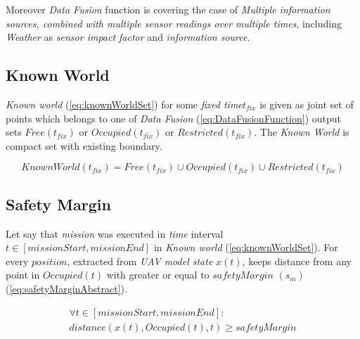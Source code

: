     
    \begin{note}
    Moreover \emph{Data Fusion} function is covering the case of \emph{Multiple information sources, combined with multiple sensor readings over multiple times}, including \emph{Weather} as \emph{sensor impact factor} and \emph{information source}. 
    \end{note}

\subsection{Known World}\label{s:KnownWorld}
    \emph{Known world} (\ref{eq:knownWorldSet}) for some \emph{fixed time}$t_{fix}$ is given as joint set of points which belongs to one of \emph{Data Fusion} (\ref{eq:DataFusionFunction}) output sets $Free(t_{fix})$ or $Occupied(t_{fix})$ or $Restricted(t_{fix})$. The \emph{Known World} is compact set with existing boundary.
    
    \begin{equation}\label{eq:knownWorldSet}
        KnownWorld(t_{fix})= Free(t_{fix}) \cup Occupied(t_{fix}) \cup Restricted(t_{fix})
    \end{equation}



\subsection{Safety Margin}\label{s:SafetyMarginDefinition}
    \noindent Let say that \emph{mission} was executed in \emph{time} interval $t\in [missionStart,missionEnd]$ in \emph{Known world} (\ref{eq:knownWorldSet}). For every $position$, extracted from \emph{UAV model state} $x(t)$, keeps distance from any point in $Occupied(t)$  with greater or equal to $safetyMargin$ $(s_m)$ (\ref{eq:safetyMarginAbstract}).  
    
    \begin{multline}\label{eq:safetyMarginAbstract}
        \forall t\in [missionStart,missionEnd]:\\distance(x(t),Occupied(t),t) \ge safetyMargin
    \end{multline}

